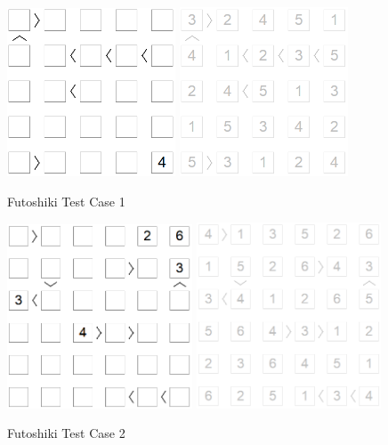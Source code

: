 ﻿\documentclass[a4paper, 11pt]{article}
\begin{document}
\begin{enumerate}
    \begin{figure}[htbp]
    \centering
    \includegraphics[width=5cm]{Pic/f1}
    \qquad
    \includegraphics[width=5cm]{Pic/f1s}
    \caption{Futoshiki Test Case 1}
    \label{fig:case11}
  \end{figure}
        \begin{figure}[htbp]
    \centering
    \includegraphics[width=5.5cm]{Pic/f2}
    \qquad
    \includegraphics[width=5.5cm]{Pic/f2s}
    \caption{Futoshiki Test Case 2}

\end{figure}
\end{enumerate}
\end{document}
